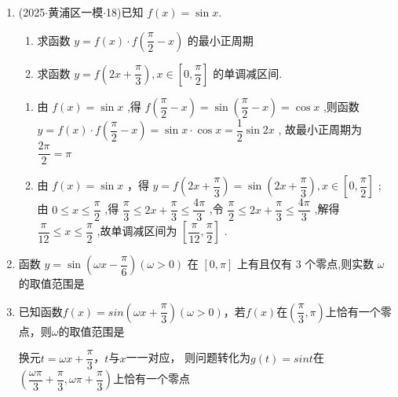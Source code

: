 \begin{enumerate}
    \item (2025$\cdot$黄浦区一模$\cdot$18)已知 $f\left( x\right)  = \sin x$.
    \begin{enumerate}
        \item 求函数 $y = f\left( x\right)  \cdot  f\left( {\dfrac{\pi }{2} - x}\right)$ 的最小正周期
        \item 求函数 $y = f\left( {{2x} + \dfrac{\pi }{3}}\right) ,x \in  \left\lbrack  {0,\dfrac{\pi }{2}}\right\rbrack$ 的单调减区间.
    \end{enumerate}
    \begin{jieda}
        \begin{enumerate}
            \item 由 $f\left( x\right)  = \sin x$ ,得 $f\left( {\dfrac{\pi }{2} - x}\right)  = \sin \left( {\dfrac{\pi }{2} - x}\right)  =  \cos x$ ,则函数 $y = f\left( x\right)  \cdot  f\left( {\dfrac{\pi }{2} - x}\right)  = \sin x \cdot  \cos x = \dfrac{1}{2}\sin {2x}$ , 故最小正周期为 $\dfrac{2\pi }{2} = \pi$
            
            \item 由 $f\left( x\right)  = \sin x$ ，得 $y = f\left( {{2x} + \dfrac{\pi }{3}}\right)  = \sin \left( {{2x} + \dfrac{\pi }{3}}\right) ,x \in  \left\lbrack  {0,\dfrac{\pi }{2}}\right\rbrack$ ; 由 $0 \leq  x \leq  \dfrac{\pi }{2}$ ,得 $\dfrac{\pi }{3} \leq  {2x} + \dfrac{\pi }{3} \leq  \dfrac{4\pi }{3}$ ,令 $\dfrac{\pi }{2} \leq  {2x} +  \dfrac{\pi }{3} \leq  \dfrac{4\pi }{3}$ ,解得 $\dfrac{\pi }{12} \leq  x \leq  \dfrac{\pi }{2}$ ,故单调减区间为 $\left\lbrack  {\dfrac{\pi }{12},\dfrac{\pi }{2}}\right\rbrack$ .
        \end{enumerate}
    \end{jieda}

    \item 函数 $y = \sin \left( {{\omega x} - \dfrac{\pi }{6}}\right) \left( {\omega  > 0}\right)$ 在 $\left\lbrack  {0,\pi }\right\rbrack$ 上有且仅有 3 个零点,则实数 $\omega$ 的取值范围是\blkda{$\left[\dfrac{13}{6}, \dfrac{19}{6}\right)$}
    

    \item 已知函数$f(x) = sin\left(\omega x + \dfrac{\pi}{3}\right) (\omega > 0)$，若$f(x)$在$\left(\dfrac{\pi}{3}, \pi\right)$上恰有一个零点，则$\omega$的取值范围是\blkda[3]{$\left(\dfrac{2}{3}, \dfrac{5}{3}\right] \cup \left[2, \dfrac{8}{3}\right]$}
        \begin{jieda}
            换元$t = \omega x + \dfrac{\pi}{3}$，$t$与$x$一一对应，
            则问题转化为$g(t) = sint$在$\left(\dfrac{\omega \pi}{3} + \dfrac{\pi}{3}, \omega \pi + \dfrac{\pi}{3} \right)$上恰有一个零点 \\
            

\end{jieda}
\end{enumerate}
